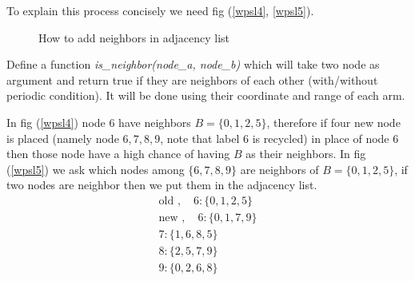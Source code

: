 \documentclass[10pt,a4paper]{report}
\begin{document}
	
	To explain this process concisely we need fig (\ref{wpsl4}, \ref{wpsl5}).
	\begin{figure}
		\centering
		\caption{How to add neighbors in adjacency list}
	\end{figure}
	
	Define a function \textit{is\_neighbor(node\_a, node\_b)} which will take two node as argument and return true if they are neighbors of each other (with/without periodic condition). It will be done using their coordinate and range of each arm.
	
	
	In fig (\ref{wpsl4}) node $6$ have neighbors $B=\{0,1,2,5\}$, therefore if four new node is placed (namely node $6,7,8,9$, note that label $6$ is recycled) in place of node $6$ then those node have a high chance of having $B$ as their neighbors. In fig (\ref{wpsl5}) we ask which nodes among $\{6,7,8,9\}$ are neighbors of $B=\{0,1,2,5\}$, if two nodes are neighbor then we put them in the adjacency list. 
	\begin{align}
		\text{old }, \quad 6 : \{0,1,2,5\} \\
		\text{new }, \quad 6 : \{0,1,7,9\} \\
		7 : \{1,6,8,5\} \\
		8 : \{2,5,7,9\} \\
		9 : \{0,2,6,8\}
	\end{align}
	
\end{document}
